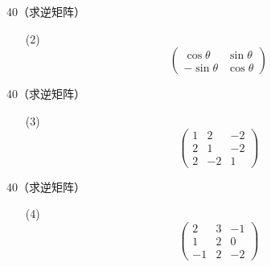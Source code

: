 \begin{frame}
  \begin{footnotesize}
    \begin{exampleblock}{40（求逆矩阵）}
      \begin{itemize}
      \item[(2)]
        $$
        \left(
        \begin{array}{rr}
          \cos\theta&\sin\theta\\
          -\sin\theta&\cos\theta
        \end{array}
        \right)
        $$
      \end{itemize}
    \end{exampleblock}
  \end{footnotesize}
\end{frame}


\begin{frame}
  \begin{footnotesize}
    \begin{exampleblock}{40（求逆矩阵）}
      \begin{itemize}
      \item[(3)]
        $$
        \left(
        \begin{array}{rrr}
          1&2&-2\\
          2&1&-2\\
          2&-2&1
        \end{array}
        \right)
        $$
      \end{itemize}
    \end{exampleblock}
  \end{footnotesize}
\end{frame}

\begin{frame}
  \begin{footnotesize}
    \begin{exampleblock}{40（求逆矩阵）}
      \begin{itemize}
      \item[(4)]
        $$
        \left(
        \begin{array}{rrr}
          2&3&-1\\
          1&2&0\\
          -1&2&-2
        \end{array}
        \right)
        $$
      \end{itemize}
    \end{exampleblock}
  \end{footnotesize}
\end{frame}

